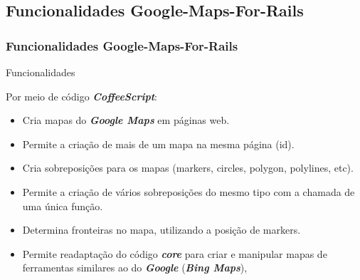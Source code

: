  \subsection{Funcionalidades Google-Maps-For-Rails}
\begin{frame}
 \frametitle{Funcionalidades Google-Maps-For-Rails}

  \begin{block}{Funcionalidades}

   Por meio de código \emph{\textbf{CoffeeScript}}:

   \begin{itemize}

    \item  Cria mapas do \emph{\textbf{Google Maps}} em páginas web.

    \item  Permite a criação de mais de um mapa na mesma página (id).

    \item  Cria sobreposições para os mapas (markers, circles, polygon, polylines, etc).

    \item  Permite a criação de vários sobreposições do mesmo tipo com a chamada de uma única função.

    \item  Determina fronteiras no mapa, utilizando a posição de markers.

    \item  Permite readaptação do código \emph{\textbf{core}} para criar e manipular mapas de ferramentas
    similares ao do \emph{\textbf{Google}} (\emph{\textbf{Bing Maps}}),

   \end{itemize}

  \end{block}

\end{frame}



